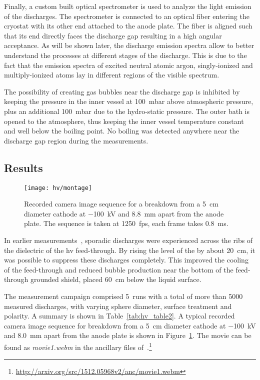 Finally, a custom built optical spectrometer is used to analyze the light emission of the discharges.
The spectrometer is connected to an optical fiber entering the cryostat with its other end attached to the anode plate.
The fiber is aligned such that its end directly faces the discharge gap resulting in a high angular acceptance.
As will be shown later, the discharge emission spectra allow to better understand the processes at different stages of the discharge.
This is due to the fact that the emission spectra of excited neutral atomic argon, singly-ionized and multiply-ionized atoms lay in different regions of the visible spectrum.

The possibility of creating gas bubbles near the discharge gap is inhibited by keeping the pressure in the inner vessel at \SI{100}{\milli\bar} above atmospheric pressure, plus an additional \SI{100}{\milli\bar} due to the hydro-static pressure.
The outer bath is opened to the atmosphere, thus keeping the inner vessel temperature constant and well below the boiling point.
No boiling was detected anywhere near the discharge gap region during the measurements.


\subsection{Results}
\label{sec:studies_hv_results}

\begin{figure}[htb]
	\centering	
	\texttt{[image: hv/montage]}
	\caption[ test high-speed footage]{
		Recorded camera image sequence for a breakdown from a \SI{5}{\centi\metre} diameter cathode at \SI{-100}{\kilo\volt} and \SI{8.8}{\milli\metre} apart from the anode plate.
		The sequence is taken at \SI{1250}{fps}, each frame takes \SI{0.8}{\milli\second}.
	}
	\label{fig:hv_images}
\end{figure}

In earlier measurements~\cite{breakdown_14}, sporadic discharges were experienced across the ribs of the dielectric of the \gls{hv} feed-through.
By rising the level of the \lar{} by about \SI{20}{\centi\metre}, it was possible to suppress these discharges completely.
This improved the cooling of the feed-through and reduced bubble production near the bottom of the feed-through grounded shield, placed \SI{60}{\centi\metre} below the liquid surface. 

The measurement campaign comprised \num{5}~runs with a total of more than \num{5000} measured discharges, with varying sphere diameter, surface treatment and polarity.
A summary is shown in Table~\ref{tab:hv_table2}.
A typical recorded camera image sequence for breakdown from a \SI{5}{\centi\metre} diameter cathode at \SI{-100}{\kilo\volt} and \SI{8.0}{\milli\metre} apart from the anode plate is shown in Figure~\ref{fig:hv_images}.
The movie can be found as \emph{movie1.webm} in the ancillary files of~\cite{breakdown_16}.\footnote{\url{http://arxiv.org/src/1512.05968v2/anc/movie1.webm}}

